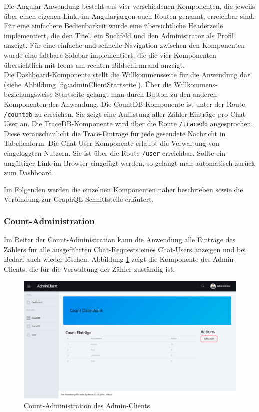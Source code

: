 \documentclass[10pt,journal,compsoc]{IEEEtran}
\begin{document}
Die Angular-Anwendung besteht aus vier verschiedenen Komponenten, die jeweils über einen eigenen Link, im Angularjargon auch Routen genannt, erreichbar sind. Für eine einfachere Bedienbarkeit wurde eine übersichtliche Headerzeile implementiert, die den Titel, ein Suchfeld und den Administrator als Profil anzeigt. Für eine einfache und schnelle Navigation zwischen den Komponenten wurde eine faltbare Sidebar implementiert, die die vier Komponenten übersichtlich mit Icons am rechten Bildschirmrand anzeigt.
\\
Die Dashboard-Komponente stellt die Willkommensseite für die Anwendung dar (siehe Abbildung \ref{fig:adminClientStartseite}). Über die Willkommens- beziehungsweise Startseite gelangt man durch Button zu den anderen Komponenten der Anwendung. Die CountDB-Komponente ist unter der Route \lstinline|/countdb| zu erreichen. Sie zeigt eine Auflistung aller Zähler-Einträge pro Chat-User an. Die TraceDB-Komponente wird über die Route \lstinline|/tracedb| angesprochen. Diese veranschaulicht die Trace-Einträge für jede gesendete Nachricht in Tabellenform. Die Chat-User-Komponente erlaubt die Verwaltung von eingeloggten Nutzern. Sie ist über die Route \lstinline|/user| erreichbar. Sollte ein ungültiger Link im Browser eingefügt werden, so gelangt man automatisch zurück zum Dashboard.

Im Folgenden werden die einzelnen Komponenten näher beschrieben sowie die Verbindung zur GraphQL Schnittstelle erläutert.


\subsubsection{Count-Administration}
Im Reiter der Count-Administration kann die Anwendung alle Einträge des Zählers für alle ausgeführten Chat-Requests eines Chat-Users anzeigen und bei Bedarf auch wieder löschen. Abbildung \ref{fig:adminClientCount} zeigt die Komponente des Admin-Clients, die für die Verwaltung der Zähler zuständig ist.

\begin{figure}[h]
	\centering
	\includegraphics[scale=0.25]{Bilder/AdminClient_Count.PNG}
	\caption{Count-Administration des Admin-Clients.}
	\label{fig:adminClientCount}
\end{figure}
\end{document}
